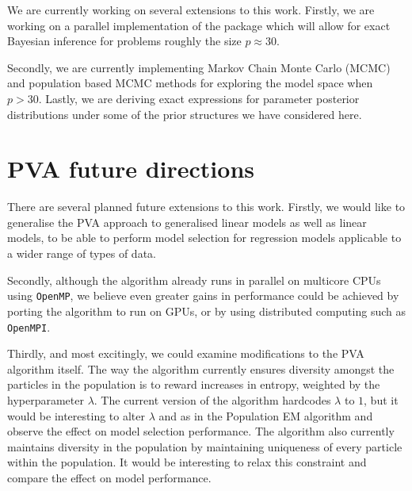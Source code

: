 We are currently working on several extensions to this work. Firstly, we are
working on a parallel implementation of the package which will allow for exact
Bayesian inference for problems roughly the size $p\approx 30$.

Secondly, we are currently implementing  Markov Chain Monte Carlo (MCMC) and
population based MCMC methods for exploring the model space when $p>30$.
Lastly, we are deriving exact expressions for parameter posterior distributions
under some of the prior structures we have considered here.

\section{PVA future directions}

There are several planned future extensions to this work. Firstly, we would
like to generalise the PVA approach to generalised linear models as well as
linear models, to be able to perform model selection for regression models
applicable to a wider range of types of data.

Secondly, although the algorithm already runs in parallel on multicore CPUs
using \texttt{OpenMP}, we believe even greater gains in performance could be
achieved by porting the algorithm to run on GPUs, or by using distributed
computing such as \texttt{OpenMPI}.

Thirdly, and most excitingly, we could examine modifications to the PVA
algorithm itself. The way the algorithm currently ensures diversity amongst the
particles in the population is to reward increases in entropy, weighted by the
hyperparameter $\lambda$. The current version of the algorithm hardcodes
$\lambda$ to $1$, but it would be interesting to alter $\lambda$ and as in the
Population EM algorithm \cite{Tan2018} and observe the effect on model
selection performance. The algorithm also currently maintains diversity in the
population by maintaining uniqueness of every particle within the population.
It would be interesting to relax this constraint and compare the effect on
model performance.
